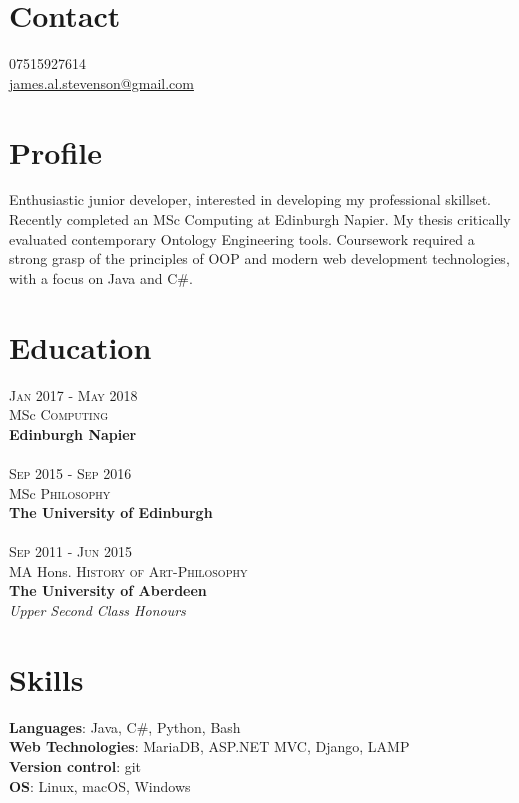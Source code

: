\documentclass[12pt, a4paper]{article}
\begin{document}
\par{\bigskip\par
\section{Contact}
\large
07515927614\\
\href{mailto:james.al.stevenson@gmail.com}{james.al.stevenson@gmail.com}\\
}

\begin{multicols}{2}

\section{Profile}
\noindent Enthusiastic junior developer, interested in developing my professional skillset.\\  
Recently completed an MSc Computing at Edinburgh Napier.
My thesis critically evaluated contemporary Ontology Engineering tools.
Coursework required a strong grasp of the principles of OOP and modern web development technologies, with a focus on Java and C\#.

\section{Education}
\noindent\textsc{Jan} 2017 - \textsc{May} 2018\\
MSc \textsc{Computing} \\
\textbf{Edinburgh Napier}\\~\\
\textsc{Sep} 2015 - \textsc{Sep} 2016\\
MSc \textsc{Philosophy} \\ 
\textbf{The University of Edinburgh}\\~\\
\textsc{Sep} 2011 - \textsc{Jun} 2015\\
MA Hons. \textsc{History of Art}-\textsc{Philosophy}\\ 
\textbf{The University of Aberdeen}\\ 
\emph{Upper Second Class Honours}

\section{Skills}
\small
\noindent\textbf{Languages}: Java, C\#, Python, Bash\\
\textbf{Web Technologies}: MariaDB, ASP.NET MVC, Django, LAMP\\
\textbf{Version control}: git\\
\textbf{OS}: Linux, macOS, Windows


\end{multicols}
\end{document}
